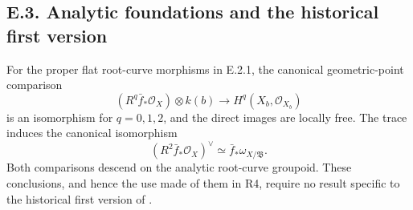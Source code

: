 \subsection{E.3. Analytic foundations and the historical first version}
\begin{proposition}\label{push:src:E.3.1}
For the proper flat root-curve morphisms in E.2.1, the canonical
geometric-point comparison
\[
 (R^q\bar f_*\mathcal O_X)\otimes k(b)
 \longrightarrow H^q(X_b,\mathcal O_{X_b})
\]
is an isomorphism for $q=0,1,2$, and the direct images are locally
free.  The trace induces the canonical isomorphism
\[
 (R^2\bar f_*\mathcal O_X)^\vee
 \simeq\bar f_*\omega_{X/\mathfrak B}.
\]
Both comparisons descend on the analytic root-curve groupoid.
These conclusions, and hence the use made of them in R4, require
no result specific to the historical first version of
\cite{DGKXv1push}.
\end{proposition}
